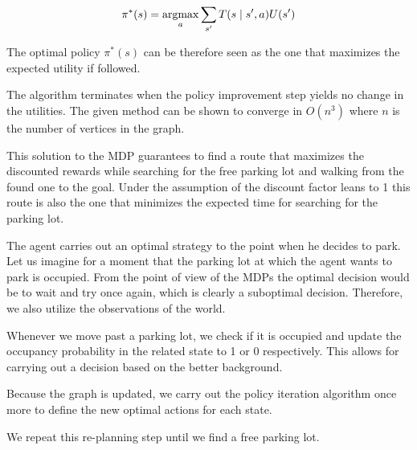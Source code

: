 \begin{equation}
\label{lbl:optimal_policy}
\pi^*(s) = \mathop{\rm argmax}_a \sum_{s'} T(s \mid s', a)U(s')
\end{equation}

The optimal policy $\pi^*(s)$ can be therefore seen as the one that maximizes
the expected utility if followed.

The algorithm terminates when the policy improvement step yields no change in
the utilities. The given method can be shown to converge in $O(n^3)$ where $n$
is the number of vertices in the graph.

This solution to the MDP guarantees to find a route that maximizes the
discounted rewards while searching for the free parking lot and walking from
the found one to the goal. Under the assumption of the discount factor leans
to 1 this route is also the one that minimizes the expected time for searching
for the parking lot.

The agent carries out an optimal strategy to the point when he decides to
park. Let us imagine for a moment that the parking lot at which the agent
wants to park is occupied. From the point of view of the MDPs the optimal
decision would be to wait and try once again, which is clearly a suboptimal
decision. Therefore, we also utilize the observations of the world.

Whenever we move past a parking lot, we check if it is occupied and update
the occupancy probability in the related state to 1 or 0 respectively.
This allows for carrying out a decision based on the better background.

Because the graph is updated, we carry out the policy iteration algorithm
once more to define the new optimal actions for each state.

We repeat this re-planning step until we find a free parking lot.

